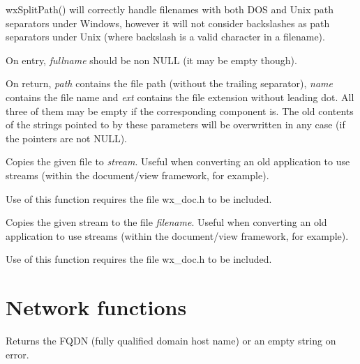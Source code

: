 wxSplitPath() will correctly handle filenames with both DOS and Unix path separators under
Windows, however it will not consider backslashes as path separators under Unix (where backslash
is a valid character in a filename).

On entry, {\it fullname} should be non NULL (it may be empty though).

On return, {\it path} contains the file path (without the trailing separator), {\it name}
contains the file name and {\it ext} contains the file extension without leading dot. All
three of them may be empty if the corresponding component is. The old contents of the
strings pointed to by these parameters will be overwritten in any case (if the pointers
are not NULL).

\label{wxtransferfiletostream}


Copies the given file to {\it stream}. Useful when converting an old application to
use streams (within the document/view framework, for example).

Use of this function requires the file wx\_doc.h to be included.

\label{wxtransferstreamtofile}


Copies the given stream to the file {\it filename}. Useful when converting an old application to
use streams (within the document/view framework, for example).

Use of this function requires the file wx\_doc.h to be included.

\section{Network functions}\label{networkfunctions}

\label{wxgetfullhostname}


Returns the FQDN (fully qualified domain host name) or an empty string on
error.




